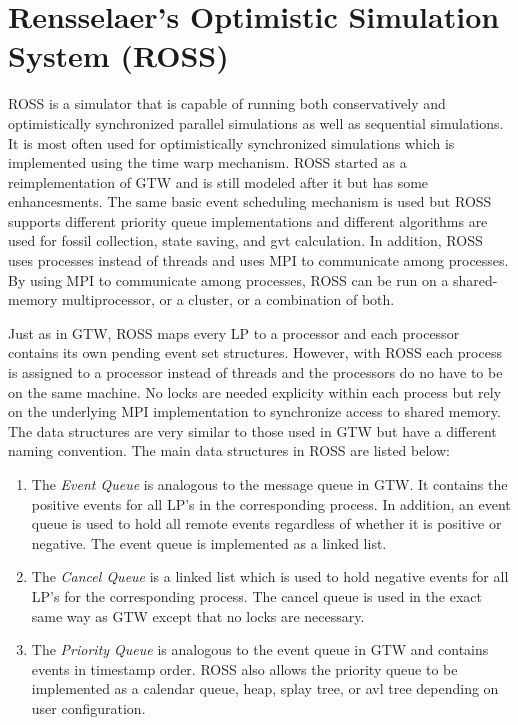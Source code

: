 \documentclass[11pt]{book}
\begin{document}

\section{Rensselaer's Optimistic Simulation System (ROSS)}

ROSS is a simulator that is capable of running both conservatively and optimistically synchronized
parallel simulations as well as sequential simulations. It is most often used for optimistically
synchronized simulations which is implemented using the time warp mechanism. ROSS started as a
reimplementation of GTW and is still modeled after it but has some enhancesments. The same basic
event scheduling mechanism is used but ROSS supports different priority queue implementations and
different algorithms are used for fossil collection, state saving, and gvt calculation. In addition,
ROSS uses processes instead of threads and uses MPI to communicate among processes. By using MPI to
communicate among processes, ROSS can be run on a shared-memory multiprocessor, or a cluster, or a
combination of both.

Just as in GTW, ROSS maps every LP to a processor and each processor contains its own pending event
set structures. However, with ROSS each process is assigned to a processor instead of threads and the
processors do no have to be on the same machine. No locks are needed explicity within each process
but rely on the underlying MPI implementation to synchronize access to shared memory. The data structures
are very similar to those used in GTW but have a different naming convention. The main data structures
in ROSS are listed below:

\begin{enumerate}

    \item The \emph{Event Queue} is analogous to the message queue in GTW. It contains the positive
        events for all LP's in the corresponding process. In addition, an event queue is used to
        hold all remote events regardless of whether it is positive or negative. The event queue is
        implemented as a linked list.
    \item The \emph{Cancel Queue} is a linked list which is used to hold negative events for all
        LP's for the corresponding process. The cancel queue is used in the exact same way as GTW
        except that no locks are necessary.
    \item The \emph{Priority Queue} is analogous to the event queue in GTW and contains events in
        timestamp order. ROSS also allows the priority queue to be implemented as a calendar queue,
        heap, splay tree, or avl tree depending on user configuration.

\end{enumerate}
\end{document}
